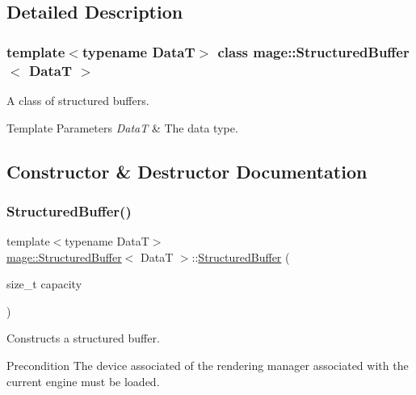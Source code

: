 \subsection{Detailed Description}
\subsubsection*{template$<$typename DataT$>$\newline
class mage\+::\+Structured\+Buffer$<$ Data\+T $>$}

A class of structured buffers.


\begin{DoxyTemplParams}{Template Parameters}
{\em DataT} & The data type. \\
\hline
\end{DoxyTemplParams}


\subsection{Constructor \& Destructor Documentation}
\hypertarget{classmage_1_1_structured_buffer_aa958c00b00f43aa16244f7d61be90045}{}\label{classmage_1_1_structured_buffer_aa958c00b00f43aa16244f7d61be90045} 
\subsubsection{\texorpdfstring{Structured\+Buffer()}{StructuredBuffer()}\hspace{0.1cm}{\footnotesize\ttfamily [1/4]}}
{\footnotesize\ttfamily template$<$typename DataT$>$ \\
\hyperlink{classmage_1_1_structured_buffer}{mage\+::\+Structured\+Buffer}$<$ DataT $>$\+::\hyperlink{classmage_1_1_structured_buffer}{Structured\+Buffer} (\begin{DoxyParamCaption}\item[{size\+\_\+t}]{capacity }\end{DoxyParamCaption})\hspace{0.3cm}{\ttfamily [explicit]}}

Constructs a structured buffer.

\begin{DoxyPrecond}{Precondition}
The device associated of the rendering manager associated with the current engine must be loaded. 
\end{DoxyPrecond}

